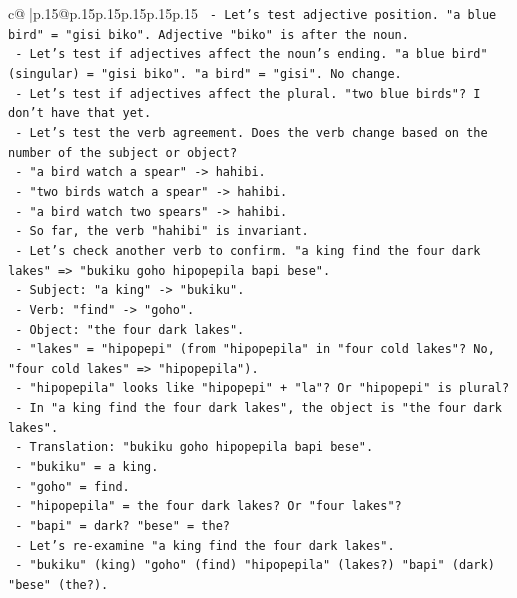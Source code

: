 \documentclass{article}
\begin{document}
{\begin{supertabular}{c@{$\;$}|p{.15\linewidth}@{}p{.15\linewidth}p{.15\linewidth}p{.15\linewidth}p{.15\linewidth}p{.15\linewidth}}
{{{\texttt{   {-} Let's test adjective position. "a blue bird" = "gisi biko". Adjective "biko" is after the noun.} \\
\texttt{   {-} Let's test if adjectives affect the noun's ending. "a blue bird" (singular) = "gisi biko". "a bird" = "gisi". No change.} \\
\texttt{   {-} Let's test if adjectives affect the plural. "two blue birds"? I don't have that yet.} \\
\texttt{   {-} Let's test the verb agreement. Does the verb change based on the number of the subject or object?} \\
\texttt{   {-} "a bird watch a spear" {-}> hahibi.} \\
\texttt{   {-} "two birds watch a spear" {-}> hahibi.} \\
\texttt{   {-} "a bird watch two spears" {-}> hahibi.} \\
\texttt{   {-} So far, the verb "hahibi" is invariant.} \\
\texttt{   {-} Let's check another verb to confirm. "a king find the four dark lakes" => "bukiku goho hipopepila bapi bese".} \\
\texttt{     {-} Subject: "a king" {-}> "bukiku".} \\
\texttt{     {-} Verb: "find" {-}> "goho".} \\
\texttt{     {-} Object: "the four dark lakes".} \\
\texttt{       {-} "lakes" = "hipopepi" (from "hipopepila" in "four cold lakes"? No, "four cold lakes" => "hipopepila").} \\
\texttt{       {-} "hipopepila" looks like "hipopepi" + "la"? Or "hipopepi" is plural?} \\
\texttt{       {-} In "a king find the four dark lakes", the object is "the four dark lakes".} \\
\texttt{       {-} Translation: "bukiku goho hipopepila bapi bese".} \\
\texttt{       {-} "bukiku" = a king.} \\
\texttt{       {-} "goho" = find.} \\
\texttt{       {-} "hipopepila" = the four dark lakes? Or "four lakes"?} \\
\texttt{       {-} "bapi" = dark? "bese" = the?} \\
\texttt{       {-} Let's re{-}examine "a king find the four dark lakes".} \\
\texttt{       {-} "bukiku" (king) "goho" (find) "hipopepila" (lakes?) "bapi" (dark) "bese" (the?).} \\
}}}
\end{supertabular}}
\end{document}
